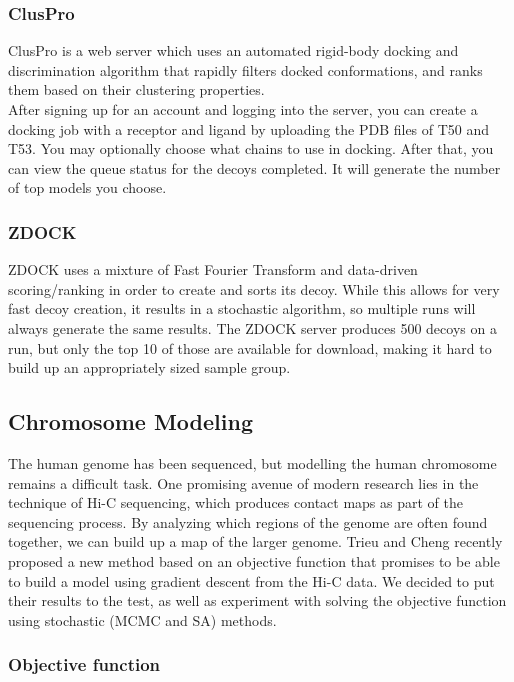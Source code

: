 \documentclass{article}
\begin{document}
\subsubsection*{ClusPro}

ClusPro is a web server which uses an automated rigid-body docking and discrimination algorithm that rapidly filters docked conformations, and ranks them based on their clustering properties.\\

After signing up for an account and logging into the server, you can create a docking job with a receptor and ligand by uploading the PDB files of T50 and T53. You may optionally choose what chains to use in docking. After that, you can view the queue status for the decoys completed. It will generate the number of top models you choose.


\subsubsection*{ZDOCK}

ZDOCK uses a mixture of Fast Fourier Transform and data-driven scoring/ranking in order to create and sorts its decoy. While this allows for very fast decoy creation, it results in a stochastic algorithm, so multiple runs will always generate the same results. The ZDOCK server produces 500 decoys on a run, but only the top 10 of those are available for download, making it hard to build up an appropriately sized sample group.


\subsection{Chromosome Modeling}

The human genome has been sequenced, but modelling the human chromosome remains a difficult task.  One promising avenue of modern research lies in the technique of Hi-C sequencing, which produces contact maps as part of the sequencing process.  By analyzing which regions of the genome are often found together, we can build up a map of the larger genome.  Trieu and Cheng recently proposed a new method based on an objective function that promises to be able to build a model using gradient descent from the Hi-C data.  We decided to put their results to the test, as well as experiment with solving the objective function using stochastic (MCMC and SA) methods.

\subsubsection{Objective function}
\end{document}
